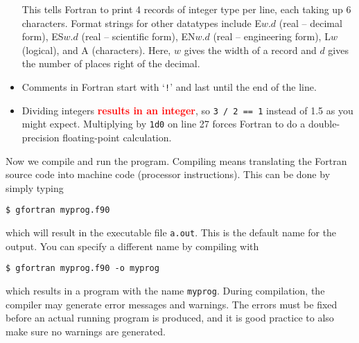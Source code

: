 \begin{itemize}
    This tells Fortran to print 4 records of integer type per line, each taking up 6 characters.
    Format strings for other datatypes include E$w.d$ (real -- decimal form), ES$w.d$ (real -- scientific form), EN$w.d$ (real -- engineering form), L$w$ (logical), and A (characters). Here, $w$ gives the width of a record and $d$ gives the number of places right of the decimal.
  \item Comments in Fortran start with `\texttt{!}' and last until the end of the line.
  \item Dividing integers \textcolor{red}{\textbf{results in an integer}}, so \texttt{3 / 2 == 1} instead of 1.5 as you might expect.
    Multiplying by \texttt{1d0} on line 27 forces Fortran to do a double-precision floating-point calculation.
\end{itemize}
Now we compile and run the program.
Compiling means translating the Fortran source code into machine code (processor instructions).
This can be done by simply typing
\begin{verbatim}
$ gfortran myprog.f90
\end{verbatim}
which will result in the executable file \texttt{a.out}.
This is the default name for the output.
You can specify a different name by compiling with
\begin{verbatim}
$ gfortran myprog.f90 -o myprog
\end{verbatim}
which results in a program with the name \texttt{myprog}.
During compilation, the compiler may generate error messages and warnings.
The errors must be fixed before an actual running program is produced, and it is good practice to also make sure no warnings are generated.

